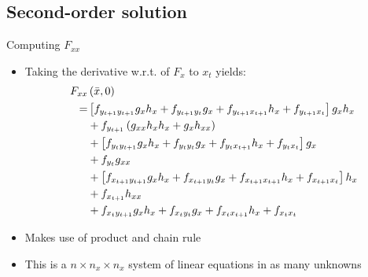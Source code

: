 \subsection{Second-order solution}
\begin{frame}{Computing $F_{xx}$}
  \begin{itemize}
    \item Taking the derivative w.r.t. of $F_x$ to $x_t$ yields:
          \begin{align}
            {F_{xx}} & \left( {\bar x,0} \right) \notag                                                                                                                                \\
            =        & \left[ {f_{y_{t + 1}{y_{t + 1}}}{g_x}{h_x} + {f_{{y_{t + 1}}{y_t}}}{g_x} + {f_{{y_{t + 1}}{x_{t + 1}}}}{h_x} + {f_{{y_{t + 1}}{x_t}}}} \right]{g_x}{h_x} \notag \\
                     & + f_{{y_{t + 1}}}\left( {{g_{xx}}{h_x}{h_x} + {g_x}{h_{xx}}} \right) \notag                                                                                     \\
                     & + \left[ {{f_{y_t y_{t + 1}}}{g_x}{h_x} + {f_{{y_t}{y_t}}}{g_x} + {f_{{y_t}{x_{t + 1}}}}{h_x} + {f_{{y_t}{x_t}}}} \right]{g_x} \notag                           \\
                     & + {f_{{y_t}}}{g_{xx}} \notag                                                                                                                                    \\
                     & + \left[ {{f_{x_{t + 1} y_{t + 1}}}{g_x}{h_x} + {f_{{x_{t + 1}}{y_t}}}{g_x} + {f_{{x_{t + 1}}{x_{t + 1}}}}{h_x} + {f_{{x_{t + 1}}{x_t}}}} \right]{h_x} \notag   \\
                     & + {f_{{x_{t + 1}}}}{h_{xx}} \notag                                                                                                                              \\
                     & + f_{x_t y_{t + 1}}{g_x}{h_x} + {f_{{x_t}{y_t}}}{g_x} + {f_{{x_t}{x_{t + 1}}}}{h_x} + {f_{{x_t}{x_t}}}
            \label{eq:F_xx}
          \end{align}
    \item Makes use of product and chain rule
    \item This is a $n \times n_x \times n_x$ system of linear equations in as many unknowns
  \end{itemize}
\end{frame}

